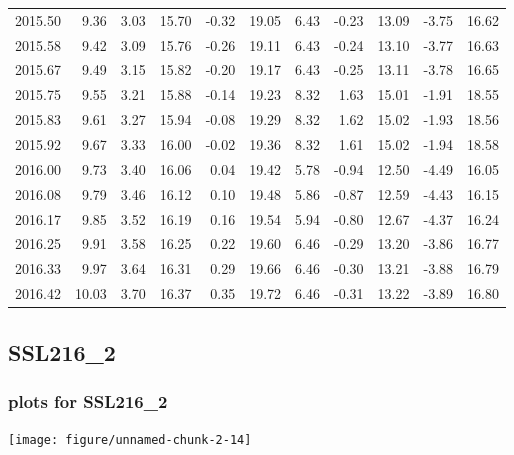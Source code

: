 \documentclass[10pt,a4paper]{article}\usepackage[]{graphicx}\usepackage[]{color}
\makeatletter
\def\maxwidth{ %
  \ifdim\Gin@nat@width>\linewidth
    \linewidth
  \else
    \Gin@nat@width
  \fi
}
\newcommand{\AaA}{\_}
\makeatother
\begin{document}
\begin{table}[ht]
\begin{tabular}{rrrrrrrrrrr}
  2015.50 & 9.36 & 3.03 & 15.70 & -0.32 & 19.05 & 6.43 & -0.23 & 13.09 & -3.75 & 16.62 \\ 
  2015.58 & 9.42 & 3.09 & 15.76 & -0.26 & 19.11 & 6.43 & -0.24 & 13.10 & -3.77 & 16.63 \\ 
  2015.67 & 9.49 & 3.15 & 15.82 & -0.20 & 19.17 & 6.43 & -0.25 & 13.11 & -3.78 & 16.65 \\ 
  2015.75 & 9.55 & 3.21 & 15.88 & -0.14 & 19.23 & 8.32 & 1.63 & 15.01 & -1.91 & 18.55 \\ 
  2015.83 & 9.61 & 3.27 & 15.94 & -0.08 & 19.29 & 8.32 & 1.62 & 15.02 & -1.93 & 18.56 \\ 
  2015.92 & 9.67 & 3.33 & 16.00 & -0.02 & 19.36 & 8.32 & 1.61 & 15.02 & -1.94 & 18.58 \\ 
  2016.00 & 9.73 & 3.40 & 16.06 & 0.04 & 19.42 & 5.78 & -0.94 & 12.50 & -4.49 & 16.05 \\ 
  2016.08 & 9.79 & 3.46 & 16.12 & 0.10 & 19.48 & 5.86 & -0.87 & 12.59 & -4.43 & 16.15 \\ 
  2016.17 & 9.85 & 3.52 & 16.19 & 0.16 & 19.54 & 5.94 & -0.80 & 12.67 & -4.37 & 16.24 \\ 
  2016.25 & 9.91 & 3.58 & 16.25 & 0.22 & 19.60 & 6.46 & -0.29 & 13.20 & -3.86 & 16.77 \\ 
  2016.33 & 9.97 & 3.64 & 16.31 & 0.29 & 19.66 & 6.46 & -0.30 & 13.21 & -3.88 & 16.79 \\ 
  2016.42 & 10.03 & 3.70 & 16.37 & 0.35 & 19.72 & 6.46 & -0.31 & 13.22 & -3.89 & 16.80 \\ 
   \hline
\end{tabular}
\end{table}

\newpage
\subsection{SSL216\AaA 2}
\subsubsection{plots for SSL216\AaA 2}

\texttt{[image: figure/unnamed-chunk-2-14]} 

\newpage
\end{document}
